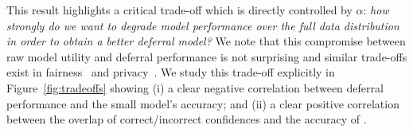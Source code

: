 This result highlights a critical trade-off which is directly controlled by $\alpha$: \emph{how strongly do we want to degrade model performance over the full data distribution in order to obtain a better deferral model?} We note that this compromise between raw model utility and deferral performance is not surprising and similar trade-offs exist in fairness~\citep{dutta2020there, yaghini2023learning} and privacy~\citep{abadi2016deep, rabanser2023training}. We study this trade-off explicitly in Figure~\ref{fig:tradeoffs} showing (i) a clear negative correlation between deferral performance and the small model's accuracy; and (ii) a clear positive correlation between the overlap of correct/incorrect confidences and the accuracy of \smallmodel. 





